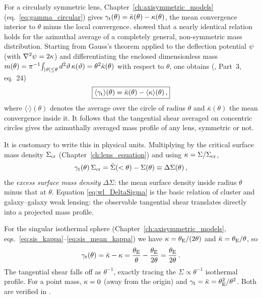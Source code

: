 For a circularly symmetric lens, Chapter~\ref{ch:axisymmetric_models}
(eq.~\ref{eq:gamma_circular}) gives
$\gamma_{\mathrm t}(\theta) = \bar\kappa(\theta) - \kappa(\theta)$,
the mean convergence interior to $\theta$ minus the local convergence.
\citet{bartelmann_1995} showed that a nearly identical relation
holds for the azimuthal average of a completely general,
non-symmetric mass distribution.  Starting from Gauss's theorem applied to
the deflection potential $\psi$ (with $\nabla^2\psi = 2\kappa$) and
differentiating the enclosed dimensionless mass
$m(\theta) = \pi^{-1}\!\int_{|\vartheta| \le \theta} d^2\vartheta\,
\kappa(\vartheta) = \theta^2\bar\kappa(\theta)$ with respect to $\theta$,
one obtains
(\citealp{schneider_kochanek_wambsganss_2006}, Part~3, eq.~24)
\begin{equation}
    \boxed{
    \langle \gamma_{\mathrm t}\rangle(\theta)
    = \bar\kappa(\theta) - \langle\kappa\rangle(\theta)\,,
    }
    \label{eq:wl_mean_tangential}
\end{equation}
where $\langle\cdot\rangle(\theta)$ denotes the average over the circle of
radius $\theta$ and $\bar\kappa(\theta)$ the mean convergence inside it.
It follows that the tangential shear averaged on concentric circles
gives the azimuthally averaged mass profile of any lens, symmetric or
not.

It is customary to write this in physical units.  Multiplying
by the critical surface mass density $\Sigma_{\mathrm{cr}}$
(Chapter~\ref{ch:lens_equation}) and using $\kappa = \Sigma/\Sigma_{\mathrm{cr}}$,
\begin{equation}
    \gamma_{\mathrm t}(\theta)\,\Sigma_{\mathrm{cr}}
    = \bar\Sigma(<\theta) - \Sigma(\theta)
    \equiv \Delta\Sigma(\theta)\,,
    \label{eq:wl_DeltaSigma}
\end{equation}
the \emph{excess surface mass density} $\Delta\Sigma$: the mean surface
density inside radius $\theta$ minus that at $\theta$.  Equation
\eqref{eq:wl_DeltaSigma} is the basic relation of cluster and galaxy--galaxy
weak lensing: the observable tangential shear translates directly into
a projected mass profile.

\begin{example}
For the singular isothermal sphere (Chapter~\ref{ch:axisymmetric_models},
eqs.~\ref{eq:sis_kappa}--\ref{eq:sis_mean_kappa}) we have
$\kappa = \theta_{\mathrm{E}}/(2\theta)$ and $\bar\kappa = \theta_{\mathrm{E}}/\theta$, so
\begin{equation}
    \gamma_{\mathrm t}(\theta) = \bar\kappa - \kappa
    = \frac{\theta_{\mathrm{E}}}{\theta} - \frac{\theta_{\mathrm{E}}}{2\theta}
    = \frac{\theta_{\mathrm{E}}}{2\theta}\,.
    \label{eq:wl_sis_gammat}
\end{equation}
The tangential shear falls off as $\theta^{-1}$, exactly tracing the
$\Sigma \propto \theta^{-1}$ isothermal profile.  For a point mass,
$\kappa = 0$ (away from the origin) and
$\gamma_{\mathrm t} = \bar\kappa = \theta_{\mathrm{E}}^2/\theta^2$.  Both are verified
in .
\end{example}


